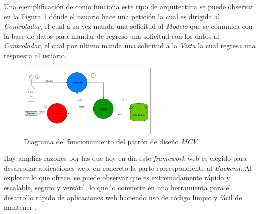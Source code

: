 Una ejemplificación de como funciona este tipo de arquitectura se puede observar en la Figura \ref{fig:patronDis} dónde el usuario hace una petición la cual es dirigida al \textit{Controlador}, el cual a su vez manda una solicitud al \textit{Modelo} que se comunica con la base de datos para mandar de regreso una solicitud con los datos al \textit{Controlador}, el cual por último manda una solicitud a la \textit{Vista} la cual regresa una respuesta al usuario.\\


    \begin{figure}[H]
        \centering
        \includegraphics[width=0.6\textwidth]{images/MVC.png}
        \caption{Diagrama del funcionamiento del patrón de diseño \textit{MCV}} \label{fig:patronDis}
    \end{figure}

Hay amplias razones por las que hoy en día este \textit{framework} web es elegido para desarrollar aplicaciones web, en concreto la parte correspondiente al \textit{Backend}. Al explorar lo que ofrece, se puede observar que es extremadamente rápido y escalable, seguro y versátil, lo que lo convierte en una herramienta para el desarrollo rápido de aplicaciones web haciendo uso de código limpio y fácil de mantener \cite{baker2022secure} \cite{gagliardi2021decoupled}.


